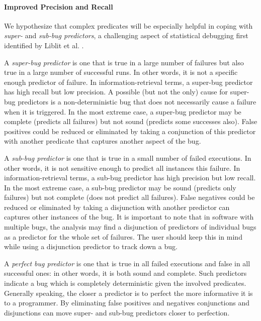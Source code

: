 \paragraph{Improved Precision and Recall}

We hypothesize that complex predicates will be especially helpful in coping with \emph{super-} and \emph{sub-bug predictors}, a challenging aspect of statistical debugging first identified by Liblit et al. \cite{Liblit:2005:SSBI}.

A \emph{super-bug predictor} is one that is true in a large number of failures but also true in a large number of successful runs.  In other words, it is not a specific enough predictor of failure.  In information-retrieval terms, a super-bug predictor has high recall but low precision.  A possible (but not the only) cause for super-bug predictors is a non-deterministic bug that does not necessarily cause a failure when it is triggered.  In the most extreme case, a super-bug predictor may be complete (predicts all failures) but not sound (predicts some successes also).  False positives could be reduced or eliminated by taking a conjunction of this predictor with another predicate that captures another aspect of the bug.

A \emph{sub-bug predictor} is one that is true in a small number of failed executions.  In other words, it is not sensitive enough to predict all instances this failure.  In information-retrieval terms, a sub-bug predictor has high precision but low recall.  In the most extreme case, a sub-bug predictor may be sound (predicts only failures) but not complete (does not predict all failures).  False negatives could be reduced or eliminated by taking a disjunction with another predictor can captures other instances of the bug.  It is important to note that in software with multiple bugs, the analysis may find a disjunction of predictors of individual bugs as a predictor for the whole set of failures.  The user should keep this in mind while using a disjunction predictor to track down a bug.

A \emph{perfect bug predictor} is one that is true in all failed executions and false in all successful ones: in other words, it is both sound and complete.  Such predictors indicate a bug which is completely deterministic given the involved predicates.  Generally speaking, the closer a predictor is to perfect the more informative it is to a programmer.  By eliminating false positives and negatives conjunctions and disjunctions can move super- and sub-bug predictors closer to perfection.

